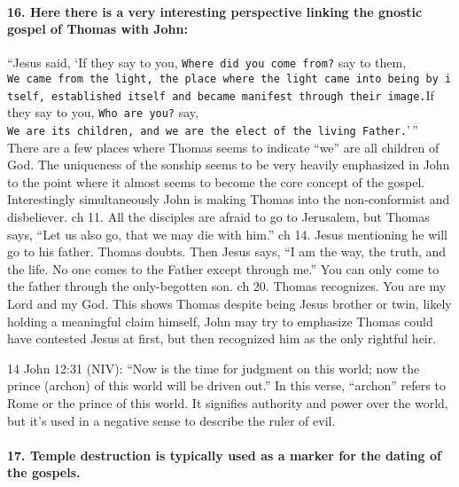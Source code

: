 \paragraph{16.
Here there is a very interesting perspective linking the gnostic gospel of Thomas with John:}\label{par:here-there-is-a-very-interesting-perspective-linking-the-gnostic-gospel-of-thomas-with-john}

``Jesus said, `If they say to you, \texttt{Where\ did\ you\ come\ from?} say to them, \texttt{We\ came\ from\ the\ light,\ the\ place\ where\ the\ light\ came\ into\ being\ by\ itself,\ established\ itself\ and\ became\ manifest\ through\ their\ image.}If they say to you, \texttt{Who\ are\ you?} say, \texttt{We\ are\ its\ children,\ and\ we\ are\ the\ elect\ of\ the\ living\ Father.}'\,'' There are a few places where Thomas seems to indicate ``we'' are all children of God.
The uniqueness of the sonship seems to be very heavily emphasized in John to the point where it almost seems to become the core concept of the gospel.
Interestingly simultaneously John is making Thomas into the non-conformist and disbeliever.
ch 11.
All the disciples are afraid to go to Jerusalem, but Thomas says, ``Let us also go, that we may die with him.'' ch 14.
Jesus mentioning he will go to his father.
Thomas doubts.
Then Jesus says, ``I am the way, the truth, and the life.
No one comes to the Father except through me.'' You can only come to the father through the only-begotten son.
ch 20.
Thomas recognizes.
You are my Lord and my God.
This shows Thomas despite being Jesus brother or twin, likely holding a meaningful claim himself, John may try to emphasize Thomas could have contested Jesus at first, but then recognized him as the only rightful heir.

14 John 12:31 (NIV): ``Now is the time for judgment on this world; now the prince (archon) of this world will be driven out.'' In this verse, ``archon'' refers to Rome or the prince of this world.
It signifies authority and power over the world, but it's used in a negative sense to describe the ruler of evil.

\paragraph{17.
Temple destruction is typically used as a marker for the dating of the gospels.}\label{par:temple-destruction-is-typically-used-as-a-marker-for-the-dating-of-the-gospels.}


